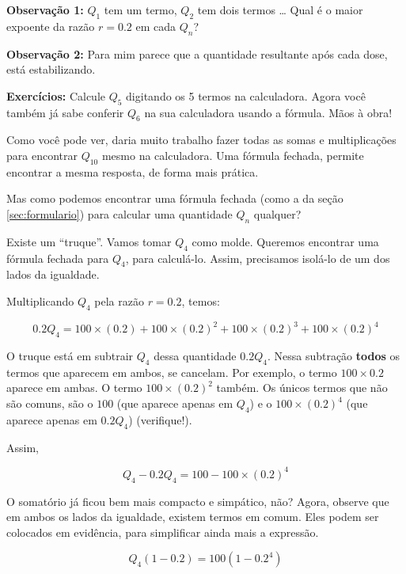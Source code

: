 \documentclass[a4paper]{article}
\begin{document}
{\bf Observação 1:} $Q_1$ tem um termo, $Q_2$ tem dois termos \ldots
Qual é o maior expoente da razão $r=0.2$ em cada $Q_n$?

{\bf Observação 2:} Para mim parece que a quantidade resultante após
cada dose, está estabilizando.%


{\bf Exercícios:} Calcule $Q_5$ digitando os 5 termos na
calculadora. Agora você também já sabe conferir $Q_6$ na sua
calculadora usando a fórmula. Mãos à obra!

\hrulefill

Como você pode ver, daria muito trabalho fazer todas as somas e
multiplicações para encontrar $Q_{10}$ mesmo na calculadora. Uma
fórmula fechada, permite encontrar a mesma resposta, de forma mais
prática.

Mas como podemos encontrar uma fórmula fechada (como a da seção
\ref{sec:formulario}) para calcular uma quantidade $Q_n$ qualquer?

Existe um ``truque''. Vamos tomar $Q_4$ como molde. Queremos encontrar
uma fórmula fechada para $Q_4$, para calculá-lo. Assim, precisamos
isolá-lo de um dos lados da igualdade.

Multiplicando $Q_4$ pela razão $r=0.2$, temos:

\begin{displaymath}
  0.2Q_4 = 100\times (0.2)+100\times (0.2)^2+100\times (0.2)^3+100\times (0.2)^4
\end{displaymath}

O truque está em subtrair $Q_4$ dessa quantidade $0.2Q_4$. Nessa
subtração {\bf todos} os termos que aparecem em ambos, se
cancelam. Por exemplo, o termo $100\times 0.2$ aparece em ambas. O
termo $100\times (0.2)^2$ também. Os únicos termos que não são comuns,
são o $100$ (que aparece apenas em $Q_4$) e o $100\times (0.2)^4$ (que
aparece apenas em $0.2Q_4$) (verifique!).

Assim,

\begin{displaymath}
  Q_4 - 0.2Q_4 = 100 - 100\times (0.2)^4
\end{displaymath}

O somatório já ficou bem mais compacto e simpático, não? Agora,
observe que em ambos os lados da igualdade, existem termos em
comum. Eles podem ser colocados em evidência, para simplificar ainda
mais a expressão.

\begin{displaymath}
  Q_4(1-0.2) = 100(1-0.2^4)
\end{displaymath}
\end{document}
